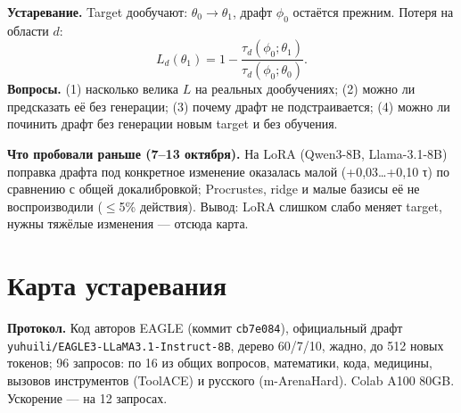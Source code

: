 \documentclass[11pt,a4paper]{article}
\begin{document}
\textbf{Устаревание.} Target дообучают: $\theta_0\to\theta_1$, драфт $\phi_0$ остаётся прежним. Потеря на области $d$:
\[
L_d(\theta_1)=1-\frac{\tau_d(\phi_0;\theta_1)}{\tau_d(\phi_0;\theta_0)} .
\]
\textbf{Вопросы.} (1) насколько велика $L$ на реальных дообучениях; (2) можно ли предсказать её без генерации;
(3) почему драфт не подстраивается; (4) можно ли починить драфт без генерации новым target и без обучения.

\textbf{Что пробовали раньше (7--13 октября).} На LoRA (Qwen3-8B, Llama-3.1-8B) поправка драфта под конкретное
изменение оказалась малой (+0,03…+0,10 τ) по сравнению с общей докалибровкой; Procrustes, ridge и малые базисы её не
воспроизводили ($\le$5\% действия). Вывод: LoRA слишком слабо меняет target, нужны тяжёлые изменения --- отсюда карта.

\section{Карта устаревания}

\textbf{Протокол.} Код авторов EAGLE (коммит \texttt{cb7e084}), официальный драфт \texttt{yuhuili/EAGLE3-LLaMA3.1-Instruct-8B},
дерево 60/7/10, жадно, до 512 новых токенов; 96 запросов: по 16 из общих вопросов, математики, кода, медицины,
вызовов инструментов (ToolACE) и русского (m-ArenaHard). Colab A100 80GB. Ускорение --- на 12 запросах.
\end{document}
